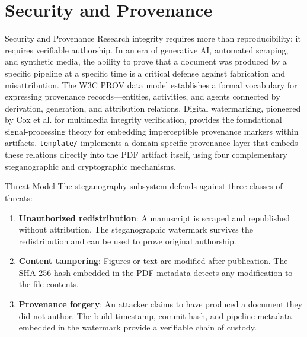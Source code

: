 \documentclass[
  ignorenonframetext,
]{beamer}
\author{\texorpdfstring{}{}}
\date{}
\providecommand{\tightlist}{%
  \setlength{\itemsep}{0pt}\setlength{\parskip}{0pt}}
\begin{document}
\section{Security and Provenance}\label{security-and-provenance}

\begin{frame}{Security and Provenance}
Research integrity requires more than reproducibility; it requires
verifiable authorship. In an era of generative AI, automated scraping,
and synthetic media, the ability to prove that a document was produced
by a specific pipeline at a specific time is a critical defense against
fabrication and misattribution. The W3C PROV data model
 establishes a formal vocabulary for expressing
provenance records---entities, activities, and agents connected by
derivation, generation, and attribution relations. Digital watermarking,
pioneered by Cox et al.  for multimedia integrity
verification, provides the foundational signal-processing theory for
embedding imperceptible provenance markers within artifacts.
\texttt{template/} implements a domain-specific provenance layer that
embeds these relations directly into the PDF artifact itself, using four
complementary steganographic and cryptographic mechanisms.
\end{frame}

\begin{frame}[allowframebreaks]{Threat Model}
\protect{}\label{threat-model}
The steganography subsystem defends against three classes of threats:

\begin{enumerate}
\tightlist
\item
  \textbf{Unauthorized redistribution}: A manuscript is scraped and
  republished without attribution. The steganographic watermark survives
  the redistribution and can be used to prove original authorship.
\item
  \textbf{Content tampering}: Figures or text are modified after
  publication. The SHA-256 hash embedded in the PDF metadata detects any
  modification to the file contents.
\item
  \textbf{Provenance forgery}: An attacker claims to have produced a
  document they did not author. The build timestamp, commit hash, and
  pipeline metadata embedded in the watermark provide a verifiable chain
  of custody.
\end{enumerate}
\end{frame}
\end{document}
